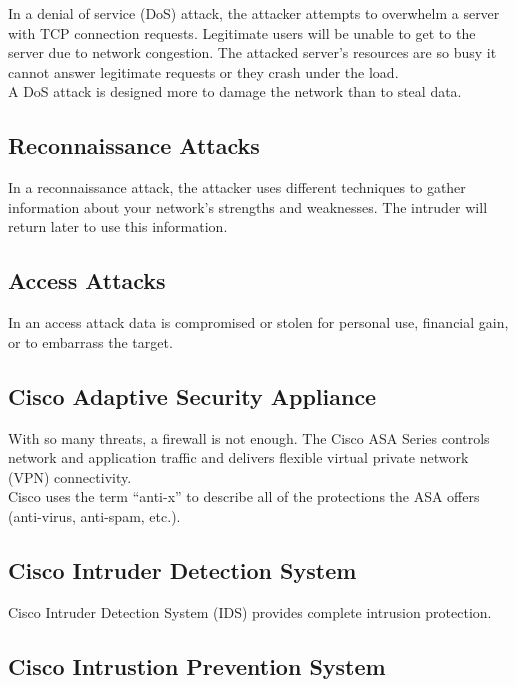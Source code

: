 In a denial of service (DoS) attack, the attacker attempts to overwhelm a
server with TCP connection requests. Legitimate users will be unable to get to
the server due to network congestion. The attacked server's resources are so
busy it cannot answer legitimate requests or they crash under the load.\\

A DoS attack is designed more to damage the network than to steal data.

\subsection{Reconnaissance Attacks}

In a reconnaissance attack, the attacker uses different techniques to gather
information about your network's strengths and weaknesses. The intruder will
return later to use this information.

\subsection{Access Attacks}

In an access attack data is compromised or stolen for personal use, financial
gain, or to embarrass the target.

\subsection{Cisco Adaptive Security Appliance}

With so many threats, a firewall is not enough. The Cisco ASA Series controls
network and application traffic and delivers flexible virtual private network
(VPN) connectivity.\\

Cisco uses the term ``anti-x'' to describe all of the protections the ASA
offers (anti-virus, anti-spam, etc.).

\subsection{Cisco Intruder Detection System}

Cisco Intruder Detection System (IDS) provides complete intrusion protection.

\subsection{Cisco Intrustion Prevention System}

